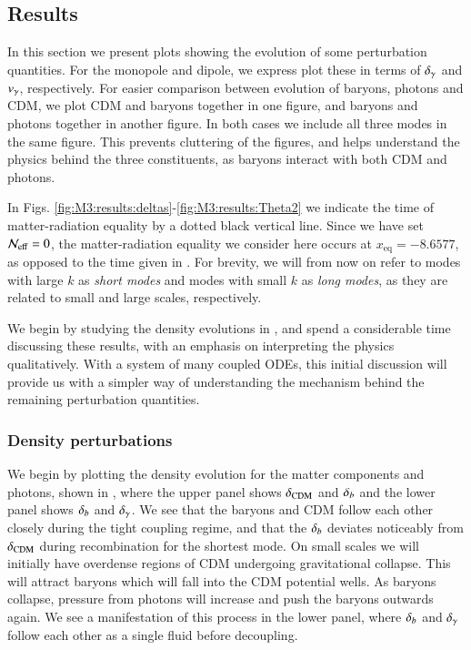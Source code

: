 \subsection{Results}\label{ssec:M3:results}

In this section we present plots showing the evolution of some perturbation quantities. For the monopole and dipole, we express plot these in terms of $\delta_\gamma$ and $v_\gamma$, respectively. For easier comparison between evolution of baryons, photons and CDM, we plot CDM and baryons together in one figure, and baryons and photons together in another figure. In both cases we include all three modes in the same figure. This prevents cluttering of the figures, and helps understand the physics behind the three constituents, as baryons interact with both CDM and photons. 

In Figs. \ref{fig:M3:results:deltas}-\ref{fig:M3:results:Theta2} we indicate the time of matter-radiation equality by a dotted black vertical line. Since we have set $\mathcal{N}_\mathrm{eff}=0$, the matter-radiation equality we consider here occurs at $x_\mathrm{eq}=-8.6577$, as opposed to the time given in . For brevity, we will from now on refer to modes with large $k$ as \textit{short modes} and modes with small $k$ as \textit{long modes}, as they are related to small and large scales, respectively. 

We begin by studying the density evolutions in , and spend a considerable time discussing these results, with an emphasis on interpreting the physics qualitatively. With a system of many coupled ODEs, this initial discussion will provide us with a simpler way of understanding the mechanism behind the remaining perturbation quantities.

\subsubsection{Density perturbations} \label{sssec:M3:results:density_perturbations}
We begin by plotting the density evolution for the matter components and photons, shown in , where the upper panel shows $\delta_\mathrm{CDM}$ and $\delta_b$ and the lower panel shows $\delta_b$ and $\delta_\gamma$. We see that the baryons and CDM follow each other closely during the tight coupling regime, and that the $\delta_b$ deviates noticeably from $\delta_\mathrm{CDM}$ during recombination for the shortest mode. On small scales we will initially have overdense regions of CDM undergoing gravitational collapse. This will attract baryons which will fall into the CDM potential wells. As baryons collapse, pressure from photons will increase and push the baryons outwards again. We see a manifestation of this process in the lower panel, where $\delta_b$ and $\delta_\gamma$ follow each other as a single fluid before decoupling. 

